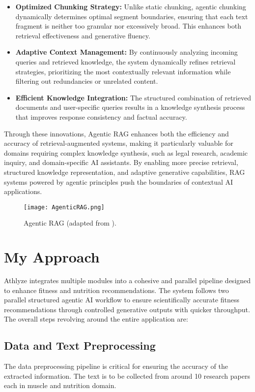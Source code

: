 \documentclass[conference]{IEEEtran}
\begin{document}
\begin{itemize}
    \item \textbf{Optimized Chunking Strategy:} Unlike static chunking, agentic chunking dynamically determines optimal segment boundaries, ensuring that each text fragment is neither too granular nor excessively broad. This enhances both retrieval effectiveness and generative fluency. \cite{3}
    \item \textbf{Adaptive Context Management:} By continuously analyzing incoming queries and retrieved knowledge, the system dynamically refines retrieval strategies, prioritizing the most contextually relevant information while filtering out redundancies or unrelated content.
    \item \textbf{Efficient Knowledge Integration:} The structured combination of retrieved documents and user-specific queries results in a knowledge synthesis process that improves response consistency and factual accuracy.
\end{itemize}

Through these innovations, Agentic RAG enhances both the efficiency and accuracy of retrieval-augmented systems, making it particularly valuable for domains requiring complex knowledge synthesis, such as legal research, academic inquiry, and domain-specific AI assistants. By enabling more precise retrieval, structured knowledge representation, and adaptive generative capabilities, RAG systems powered by agentic principles push the boundaries of contextual AI applications.

\begin{figure}[h!]
    \centering
    \texttt{[image: AgenticRAG.png]}
    \caption{Agentic RAG (adapted from \cite{12}).}
    \label{fig:RAG}
\end{figure}


\section{My Approach}
Athlyze integrates multiple modules into a cohesive and parallel pipeline designed to enhance fitness and nutrition recommendations. The system follows two parallel structured agentic AI workflow to ensure scientifically accurate fitness recommendations through controlled generative outputs with quicker throughput. The overall steps revolving around the entire application are:

\subsection{Data and Text Preprocessing}
The data preprocessing pipeline is critical for ensuring the accuracy of the extracted information. The text is to be collected from around 10 research papers each in muscle and nutrition domain.
\end{document}
